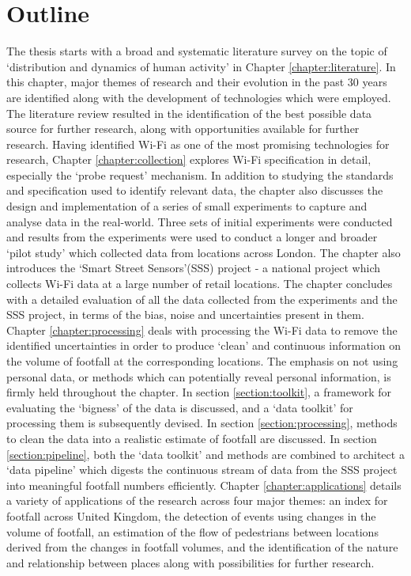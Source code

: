 \section{Outline}

The thesis starts with a broad and systematic literature survey on the topic of `distribution and dynamics of human activity' in Chapter \ref{chapter:literature}.
In this chapter, major themes of research and their evolution in the past 30 years are identified along with the development of technologies which were employed.
The literature review resulted in the identification of the best possible data source for further research, along with opportunities available for further research.
Having identified Wi-Fi as one of the most promising technologies for research, Chapter \ref{chapter:collection} explores Wi-Fi specification in detail, especially the `probe request' mechanism.
In addition to studying the standards and specification used to identify relevant data, the chapter also discusses the design and implementation of a series of small experiments to capture and analyse data in the real-world.
Three sets of initial experiments were conducted and results from the experiments were used to conduct a longer and broader `pilot study' which collected data from locations across London.
The chapter also introduces the `Smart Street Sensors'(SSS) project - a national project which collects Wi-Fi data at a large number of retail locations.
The chapter concludes with a detailed evaluation of all the data collected from the experiments and the SSS project, in terms of the bias, noise and uncertainties present in them.
Chapter \ref{chapter:processing} deals with processing the Wi-Fi data to remove the identified uncertainties in order to produce `clean' and continuous information on the volume of footfall at the corresponding locations.
The emphasis on not using personal data, or methods which can potentially reveal personal information, is firmly held throughout the chapter.
In section \ref{section:toolkit}, a framework for evaluating the `bigness' of the data is discussed, and a `data toolkit' for processing them is subsequently devised.
In section \ref{section:processing}, methods to clean the data into a realistic estimate of footfall are discussed.
In section \ref{section:pipeline}, both the `data toolkit' and methods are combined to architect a `data pipeline' which digests the continuous stream of data from the SSS project into meaningful footfall numbers efficiently.
Chapter \ref{chapter:applications} details a variety of applications of the research across four major themes: an index for footfall across United Kingdom, the detection of events using changes in the volume of footfall, an estimation of the flow of pedestrians between locations derived from the changes in footfall volumes, and the identification of the nature and relationship between places along with possibilities for further research.

